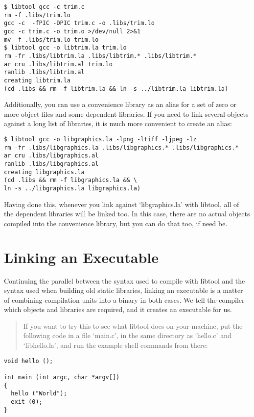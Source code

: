 \begin{Verbatim}
$ libtool gcc -c trim.c
rm -f .libs/trim.lo
gcc -c  -fPIC -DPIC trim.c -o .libs/trim.lo
gcc -c trim.c -o trim.o >/dev/null 2>&1
mv -f .libs/trim.lo trim.lo
$ libtool gcc -o libtrim.la trim.lo
rm -fr .libs/libtrim.la .libs/libtrim.* .libs/libtrim.*
ar cru .libs/libtrim.al trim.lo
ranlib .libs/libtrim.al
creating libtrim.la
(cd .libs && rm -f libtrim.la && ln -s ../libtrim.la libtrim.la)
\end{Verbatim}

Additionally, you can use a convenience library as an alias for a set of zero 
or more object files and some dependent libraries. If you need to link several 
objects against a long list of libraries, it is much more convenient to create 
an alias:

\begin{Verbatim}
$ libtool gcc -o libgraphics.la -lpng -ltiff -ljpeg -lz
rm -fr .libs/libgraphics.la .libs/libgraphics.* .libs/libgraphics.*
ar cru .libs/libgraphics.al
ranlib .libs/libgraphics.al
creating libgraphics.la
(cd .libs && rm -f libgraphics.la && \
ln -s ../libgraphics.la libgraphics.la)
\end{Verbatim}

Having done this, whenever you link against `libgraphics.la' with libtool, all 
of the dependent libraries will be linked too. In this case, there are no 
actual objects compiled into the convenience library, but you can do that too,
if need be. 

\section{Linking an Executable}\label{S_Linking_an_Executable}

Continuing the parallel between the syntax used to compile with libtool and the syntax used when building old static libraries, linking an executable is a matter of combining compilation units into a binary in both cases. We tell the compiler which objects and libraries are required, and it creates an executable for us. 

\begin{quote}
If you want to try this to see what libtool does on your machine, put the following code in a file `main.c', in the same directory as `hello.c' and `libhello.la', and run the example shell commands from there: 
\end{quote}


 
\begin{Verbatim}
void hello ();

int main (int argc, char *argv[])
{
  hello ("World");
  exit (0);
}
\end{Verbatim}

